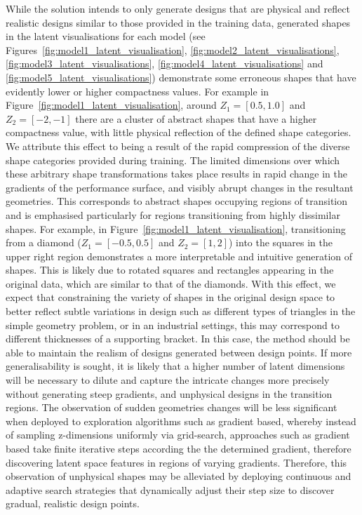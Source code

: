 \documentclass{article}
\begin{document}
While the solution intends to only generate designs that are physical and reflect realistic designs similar to those provided in the training data,  generated shapes in the latent visualisations for each model (see Figures~\ref{fig:model1_latent_visualisation}, \ref{fig:model2_latent_visualisations}, \ref{fig:model3_latent_visualisations}, \ref{fig:model4_latent_visualisations} and \ref{fig:model5_latent_visualisations}) demonstrate some erroneous shapes that have evidently lower or higher compactness values. For example in Figure~\ref{fig:model1_latent_visualisation}, around $Z_1=[0.5,1.0]$ and $Z_2=[-2,-1]$ there are a cluster of abstract shapes that have a higher compactness value, with little physical reflection of the defined shape categories. We attribute this effect to being a result of the rapid compression of the diverse shape categories provided during training. The limited dimensions over which these arbitrary shape transformations takes place results in rapid change in the gradients of the performance surface, and visibly abrupt changes in the resultant geometries. This corresponds to abstract shapes occupying regions of transition and is emphasised particularly for regions transitioning from highly dissimilar shapes. For example, in Figure~\ref{fig:model1_latent_visualisation}, transitioning from a diamond ($Z_1=[-0.5,0.5]$ and $Z_2=[1,2]$) into the squares in the upper right region demonstrates a more interpretable and intuitive generation of shapes. This is likely due to rotated squares and rectangles appearing in the original data, which are similar to that of the diamonds. With this effect, we expect that constraining the variety of shapes in the original design space to better reflect subtle variations in design such as different types of triangles in the simple geometry problem, or in an industrial settings, this may correspond to different thicknesses of a supporting bracket. In this case, the method should be able to maintain the realism of designs generated between design points. If more generalisability is sought, it is likely that a higher number of latent dimensions will be necessary to dilute and capture the intricate changes more precisely without generating steep gradients, and unphysical designs in the transition regions. The observation of sudden geometries changes will be less significant when deployed to exploration algorithms such as gradient based, whereby instead of sampling z-dimensions uniformly via grid-search, approaches such as gradient based take finite iterative steps according the the determined gradient, therefore discovering latent space features in regions of varying gradients. Therefore, this observation of unphysical shapes may be alleviated by deploying continuous and adaptive search strategies that dynamically adjust their step size to discover gradual, realistic design points.
\end{document}
